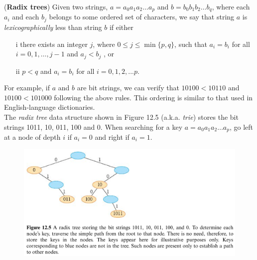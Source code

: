 \noindent {} 
(\textbf{Radix trees}) Given two strings, $a = a_0 a_1 a_2 \dots a_p$ and $b = b_0 b_1 b_2 \dots b_q$, where each $a_i$ and each $b_j$ belongs to some ordered set of characters, we say that string $a$ is \textit{lexicographically} less than string $b$ if either 
\begin{enumerate}
    \item[i] there exists an integer $j$, where $0 \leq j \leq \min\{p, q\}$, such that $a_i = b_i$ for all $i = 0, 1, \dots , j - 1$ and $a_j < b_j$ , or
    \item[ii] $p < q$ and $a_i = b_i$ for all $i = 0, 1, 2, . . . p$.
\end{enumerate}
For example, if $a$ and $b$ are bit strings, we can verify that $10100 < 10110$ and $10100 < 101000$ following the above rules. This ordering is similar to that used in English-language dictionaries. \\
The \textit{radix tree} data structure shown in Figure 12.5 (a.k.a. \textit{trie}) stores the bit strings 1011, 10, 011, 100
and 0. When searching for a key $a = a_0 a_1 a_2 \dots a_p$, go left at a node of depth $i$ if $a_i = 0$ and right if $a_i = 1$.
\begin{figure}[!h]
    \centering
    \includegraphics[width=\linewidth]{HWs//HW7//figures/4.png}
\end{figure}
